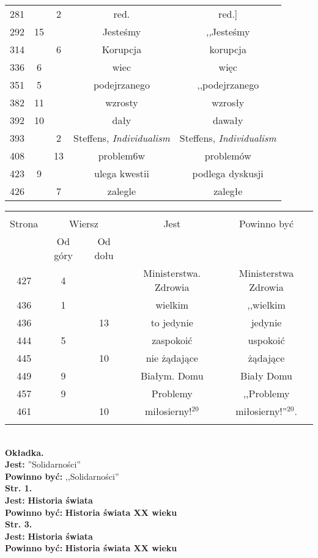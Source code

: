 \documentclass[a4paper,11pt]{article}
\newcommand{\tb}{\textbf}
\newcommand{\noi}{\noindent}
\newcommand{\Str}[1]{\tb{Str. #1.}}
\newcommand{\Jest}{\tb{Jest: }}
\newcommand{\Pow}{\tb{Powinno być: }}
\begin{document}
\begin{center}
\begin{tabular}{|c|c|c|c|c|}
    281 & & 2 & red. & red.] \\
    292 & 15 & & Jesteśmy & ,,Jesteśmy \\ %
    314 & & 6 & Korupcja & korupcja \\
    336 & 6 & & wiec & więc \\
    351 & 5 & & podejrzanego & ,,podejrzanego \\ %
    382 & 11 & & wzrosty & wzrosły \\
    392 & 10 & & dały & dawały \\
    393 & & 2 & Steffens,{ }{ }\emph{Individualism}
           & Steffens, \emph{Individualism} \\
    408 & & 13 & problem6w & problemów \\
    423 & 9 & & ulega kwestii & podlega dyskusji \\
    426 & & 7 & zalegle & zaległe \\ \hline
  \end{tabular}
\end{center}

\begin{center}
  \begin{tabular}{|c|c|c|c|c|}
    \hline
    & \multicolumn{2}{c|}{} & & \\
    Strona & \multicolumn{2}{c|}{Wiersz}& Jest & Powinno być \\ \cline{2-3}
    & Od góry & Od dołu & & \\ \hline
    427 & 4 & & Ministerstwa. Zdrowia & Ministerstwa Zdrowia \\
    436 & 1 & & wielkim & ,,wielkim \\ %
    436 & & 13 & to jedynie & jedynie \\
    444 & 5 & & zaspokoić & uspokoić \\
    445 & & 10 & nie żądające & żądające \\
    449 & 9 & & Białym. Domu & Biały Domu \\
    457 & 9 & & Problemy & ,,Problemy \\ %
    461 & & 10 & miłosierny!$^{ 20 }$ & miłosierny!''$^{ 20 }$. \\
    & & & & \\ \hline
  \end{tabular}
\end{center}
\noi \\
\tb{Okładka.} \\
\Jest ''Solidarności'' \\
\Pow ,,Solidarności'' \\
\Str{1} \\
\Jest \tb{Historia świata} \\
\Pow \tb{Historia świata XX wieku} \\
\Str{3} \\
\Jest \tb{Historia świata} \\
\Pow \tb{Historia świata XX wieku} \\
\end{document}
